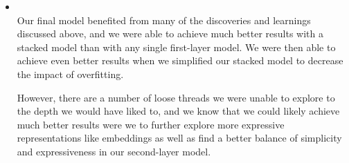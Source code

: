 \begin{itemize}
    \item {} \\
        Our final model benefited from many of the discoveries and learnings discussed above, and we were able to achieve much better results with a stacked model than with any single first-layer model. We were then able to achieve even better results when we simplified our stacked model to decrease the impact of overfitting.

        However, there are a number of loose threads we were unable to explore to the depth we would have liked to, and we know that we could likely achieve much better results were we to further explore more expressive representations like embeddings as well as find a better balance of simplicity and expressiveness in our second-layer model.

\end{itemize}






